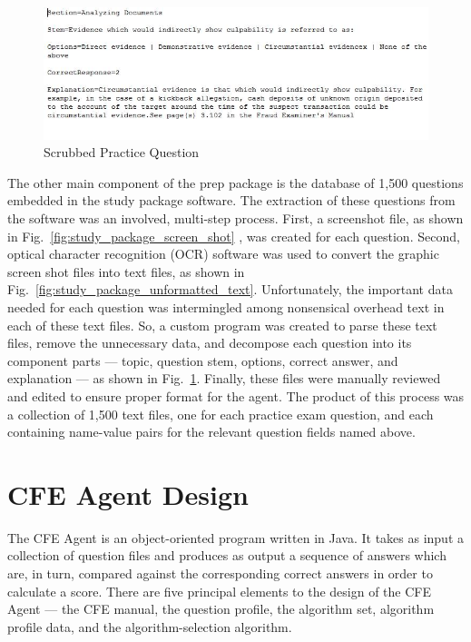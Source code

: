 \begin{figure}
\centering
\vspace{2.0in}
\includegraphics[scale=0.75]{study_package_formatted_text.jpg}
\caption{Scrubbed Practice Question}
\label{fig:study_package_formatted_text}
\end{figure}

The other main component of the prep package is the database of 1,500 questions embedded in the study package software.  The extraction of these questions from the software was an involved, multi-step process.  First, a screenshot file, as shown in Fig.~\ref{fig:study_package_screen_shot} \cite{acfe_study_package_2011},  was created for each question.  Second, optical character recognition (OCR) software was used to convert the graphic screen shot files into text files, as shown in Fig.~\ref{fig:study_package_unformatted_text}.  Unfortunately, the important data needed for each question was intermingled among nonsensical overhead text in each of these text files.  So, a custom program was created to parse these text files, remove the unnecessary data, and decompose each question into its component parts --- topic, question stem, options, correct answer, and explanation --- as shown in Fig.~\ref{fig:study_package_formatted_text}.  Finally, these files were manually reviewed and edited to ensure proper format for the agent.  The product of this process was a collection of 1,500 text files, one for each practice exam question, and each containing name-value pairs for the relevant question fields named above.




\section{CFE Agent Design}

The CFE Agent is an object-oriented program written in Java.  It takes as input a collection of question files and produces as output a sequence of answers which are, in turn, compared against the corresponding correct answers in order to calculate a score.  There are five principal elements to the design of the CFE Agent --- the CFE manual, the question profile, the algorithm set, algorithm profile data, and the algorithm-selection algorithm.

